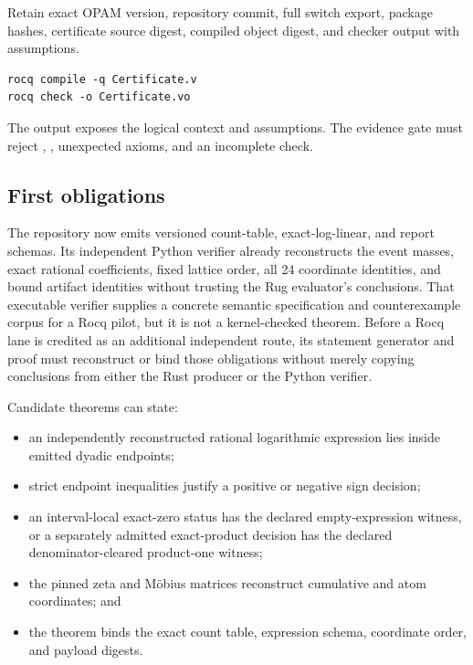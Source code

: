 \documentclass[11pt]{article}
\begin{document}
Retain exact OPAM version, repository commit, full switch export, package hashes, certificate
source digest, compiled object digest, and checker output with assumptions.

\begin{lstlisting}
rocq compile -q Certificate.v
rocq check -o Certificate.vo
\end{lstlisting}

The  output exposes the logical context and assumptions.  The evidence gate must reject
, , unexpected axioms, and an incomplete check.

\subsection{First obligations}

The repository now emits versioned count-table, exact-log-linear, and report schemas.  Its
independent Python verifier already reconstructs the event masses, exact rational coefficients,
fixed lattice order, all 24 coordinate identities, and bound artifact identities without trusting
the Rug evaluator's conclusions.  That executable verifier supplies a concrete semantic
specification and counterexample corpus for a Rocq pilot, but it is not a kernel-checked theorem.
Before a Rocq lane is credited as an additional independent route, its statement generator and
proof must reconstruct or bind those obligations without merely copying conclusions from either
the Rust producer or the Python verifier.

Candidate theorems can state:
\begin{itemize}[leftmargin=*]
  \item an independently reconstructed rational logarithmic expression lies inside emitted dyadic
  endpoints;
  \item strict endpoint inequalities justify a positive or negative sign decision;
  \item an interval-local exact-zero status has the declared empty-expression witness, or a
  separately admitted exact-product decision has the declared denominator-cleared product-one
  witness;
  \item the pinned zeta and M{\"o}bius matrices reconstruct cumulative and atom coordinates; and
  \item the theorem binds the exact count table, expression schema, coordinate order, and payload
  digests.
\end{itemize}
\end{document}
